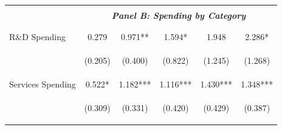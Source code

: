 \documentclass[dv_diss_main.tex]{subfiles}
\begin{document}
\begin{table}[H]
\begin{center}
{\begin{tabular}{lccccc}
    \cmidrule{2-6}
    \vspace{-1.5pt} & \vspace{-1.5pt} & \vspace{-1.5pt} & \vspace{-1.5pt} & \vspace{-1.5pt} \\
    & \multicolumn{5}{c}{\textit{\textbf{Panel B: Spending by Category}}} \\ 
    \vspace{-1.5pt} & \vspace{-1.5pt} & \vspace{-1.5pt} & \vspace{-1.5pt} & \vspace{-1.5pt} \\ 
    \cmidrule{2-6}
    \vspace{-1.5pt} & \vspace{-1.5pt} & \vspace{-1.5pt} & \vspace{-1.5pt} & \vspace{-1.5pt} \\
    R\&D Spending & 0.279 & 0.971** & 1.594* & 1.948 & 2.286* \\
    \vspace{4pt} & \begin{footnotesize}(0.205)\end{footnotesize} & \begin{footnotesize}(0.400)\end{footnotesize} & \begin{footnotesize}(0.822)\end{footnotesize} & \begin{footnotesize}(1.245)\end{footnotesize} & \begin{footnotesize}(1.268)\end{footnotesize} \\
    Services Spending & 0.522* & 1.182*** & 1.116*** & 1.430*** & 1.348*** \\
    \vspace{4pt} & \begin{footnotesize}(0.309)\end{footnotesize} & \begin{footnotesize}(0.331)\end{footnotesize} & \begin{footnotesize}(0.420)\end{footnotesize} & \begin{footnotesize}(0.429)\end{footnotesize} & \begin{footnotesize}(0.387)\end{footnotesize} \\

\end{tabular}}
\end{center}
\end{table}
\end{document}

